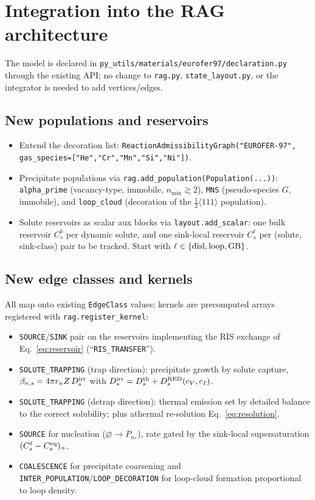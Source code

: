 \documentclass[11pt]{article}
\newcommand{\cv}{c_{V}}
\newcommand{\ci}{c_{I}}
\newcommand{\code}[1]{\texttt{#1}}
\begin{document}
\section{Integration into the RAG architecture}
\label{sec:arch}
The model is declared in \code{py\_utils/materials/eurofer97/declaration.py}
through the existing API; no change to \code{rag.py}, \code{state\_layout.py},
or the integrator is needed to add vertices/edges.

\subsection{New populations and reservoirs}
\begin{itemize}[leftmargin=1.4em]
\item Extend the decoration list:
\code{ReactionAdmissibilityGraph("EUROFER-97", gas\_species=["He","Cr","Mn","Si","Ni"])}.
\item Precipitate populations via \code{rag.add\_population(Population(...))}:
\code{alpha\_prime} (vacancy-type, immobile, $n_{\min}\!\gtrsim\!2$),
\code{MNS} (pseudo-species $G$, immobile), and \code{loop\_cloud}
(decoration of the $\tfrac12\langle111\rangle$ population).
\item Solute reservoirs as scalar aux blocks via \code{layout.add\_scalar}:
one bulk reservoir $C_s^{b}$ per dynamic solute, and one sink-local reservoir
$C_s^{\ell}$ per (solute, sink-class) pair to be tracked. Start with
$\ell\in\{\rm disl,loop,GB\}$.
\end{itemize}

\subsection{New edge classes and kernels}
All map onto existing \code{EdgeClass} values; kernels are precomputed arrays
registered with \code{rag.register\_kernel}:
\begin{itemize}[leftmargin=1.4em]
\item \code{SOURCE}/\code{SINK} pair on the reservoirs implementing the RIS
exchange of Eq.~\eqref{eq:reservoir} (``\code{RIS\_TRANSFER}'').
\item \code{SOLUTE\_TRAPPING} (trap direction): precipitate growth by solute
capture, $\beta_{n,s}=4\pi r_n Z\,D_s^{\rm irr}$ with
$D_s^{\rm irr}=D_s^{\rm th}+D_s^{\rm RED}(\cv,\ci)$.
\item \code{SOLUTE\_TRAPPING} (detrap direction): thermal emission set by
detailed balance to the correct solubility; plus athermal re-solution
Eq.~\eqref{eq:resolution}.
\item \code{SOURCE} for nucleation ($\varnothing\!\to\!P_{n_*}$), rate gated by
the sink-local supersaturation $(C_s^{\ell}-C_s^{\rm eq})_+$.
\item \code{COALESCENCE} for precipitate coarsening and
\code{INTER\_POPULATION}/\code{LOOP\_DECORATION} for loop-cloud formation
proportional to loop density.
\end{itemize}
\end{document}

